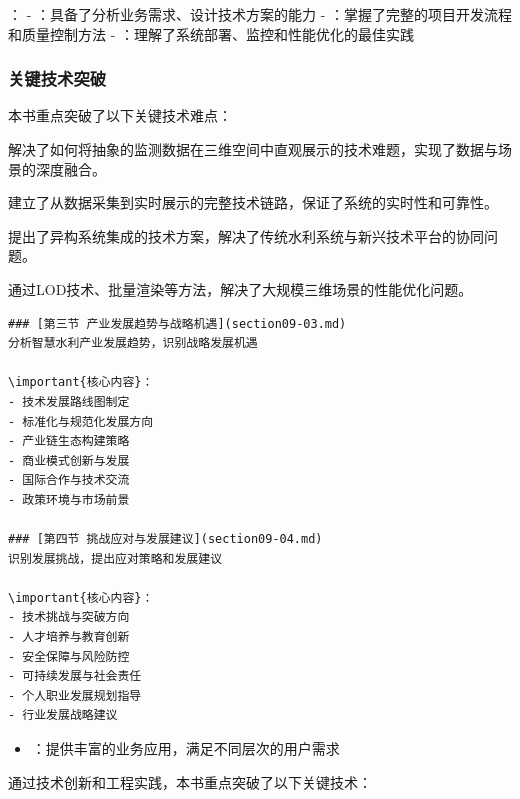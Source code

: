 ： - ：具备了分析业务需求、设计技术方案的能力 - ：掌握了完整的项目开发流程和质量控制方法 - ：理解了系统部署、监控和性能优化的最佳实践

\hypertarget{ux5173ux952eux6280ux672fux7a81ux7834}{%
\subsubsection{关键技术突破}\label{ux5173ux952eux6280ux672fux7a81ux7834}}

本书重点突破了以下关键技术难点：


解决了如何将抽象的监测数据在三维空间中直观展示的技术难题，实现了数据与场景的深度融合。


建立了从数据采集到实时展示的完整技术链路，保证了系统的实时性和可靠性。


提出了异构系统集成的技术方案，解决了传统水利系统与新兴技术平台的协同问题。


通过LOD技术、批量渲染等方法，解决了大规模三维场景的性能优化问题。

\begin{verbatim}
### [第三节 产业发展趋势与战略机遇](section09-03.md)
分析智慧水利产业发展趋势，识别战略发展机遇

\important{核心内容}：
- 技术发展路线图制定
- 标准化与规范化发展方向
- 产业链生态构建策略
- 商业模式创新与发展
- 国际合作与技术交流
- 政策环境与市场前景

### [第四节 挑战应对与发展建议](section09-04.md)
识别发展挑战，提出应对策略和发展建议

\important{核心内容}：
- 技术挑战与突破方向
- 人才培养与教育创新
- 安全保障与风险防控
- 可持续发展与社会责任
- 个人职业发展规划指导
- 行业发展战略建议
\end{verbatim}

\begin{itemize}
\tightlist
\item
  ：提供丰富的业务应用，满足不同层次的用户需求
\end{itemize}


通过技术创新和工程实践，本书重点突破了以下关键技术：

